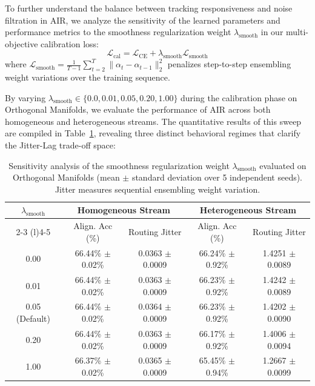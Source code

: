 \documentclass{article}
\theoremstyle{plain}
\theoremstyle{definition}
\theoremstyle{remark}
\begin{document}
To further understand the balance between tracking responsiveness and noise filtration in AIR, we analyze the sensitivity of the learned parameters and performance metrics to the smoothness regularization weight $\lambda_{\text{smooth}}$ in our multi-objective calibration loss:
\begin{equation}
\mathcal{L}_{\text{cal}} = \mathcal{L}_{\text{CE}} + \lambda_{\text{smooth}} \mathcal{L}_{\text{smooth}}
\end{equation}
where $\mathcal{L}_{\text{smooth}} = \frac{1}{T-1} \sum_{t=2}^T \|\alpha_t - \alpha_{t-1}\|_2^2$ penalizes step-to-step ensembling weight variations over the training sequence. 

By varying $\lambda_{\text{smooth}} \in \{0.0, 0.01, 0.05, 0.20, 1.00\}$ during the calibration phase on Orthogonal Manifolds, we evaluate the performance of AIR across both homogeneous and heterogeneous streams. The quantitative results of this sweep are compiled in Table~\ref{tab:sensitivity_sweep}, revealing three distinct behavioral regimes that clarify the Jitter-Lag trade-off space:

\begin{table}[h]
\caption{Sensitivity analysis of the smoothness regularization weight $\lambda_{\text{smooth}}$ evaluated on Orthogonal Manifolds (mean $\pm$ standard deviation over 5 independent seeds). Jitter measures sequential ensembling weight variation.}
\label{tab:sensitivity_sweep}
\vskip 0.1in
\begin{center}
\begin{small}
\begin{sc}
\setlength{\tabcolsep}{4pt}
\begin{tabular}{ccccc}
\toprule
$\lambda_{\text{smooth}}$ & \multicolumn{2}{c}{Homogeneous Stream} & \multicolumn{2}{c}{Heterogeneous Stream} \\
\cmidrule(r){2-3} \cmidrule(l){4-5}
& Align. Acc (\%) & Routing Jitter & Align. Acc (\%) & Routing Jitter \\
\midrule
0.00 & 66.44\% $\pm$ 0.02\% & 0.0363 $\pm$ 0.0009 & 66.24\% $\pm$ 0.92\% & 1.4251 $\pm$ 0.0089 \\
0.01 & 66.44\% $\pm$ 0.02\% & 0.0363 $\pm$ 0.0009 & 66.23\% $\pm$ 0.92\% & 1.4242 $\pm$ 0.0089 \\
0.05 (Default) & 66.44\% $\pm$ 0.02\% & 0.0364 $\pm$ 0.0009 & 66.23\% $\pm$ 0.92\% & 1.4202 $\pm$ 0.0090 \\
0.20 & 66.44\% $\pm$ 0.02\% & 0.0363 $\pm$ 0.0009 & 66.17\% $\pm$ 0.92\% & 1.4006 $\pm$ 0.0094 \\
1.00 & 66.37\% $\pm$ 0.02\% & 0.0365 $\pm$ 0.0009 & 65.45\% $\pm$ 0.94\% & 1.2667 $\pm$ 0.0099 \\
\bottomrule
\end{tabular}
\end{sc}
\end{small}
\end{center}
\vskip -0.1in
\end{table}
\end{document}
